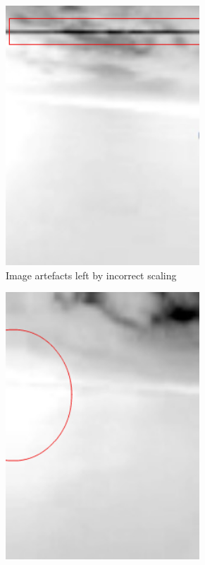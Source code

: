 \begin{figure}
\centering
\begin{subfigure}{0.3\textwidth}
 \centering
 \includegraphics[width=0.8\textwidth]{"./image/artefacts_circled"}
 \caption{Image artefacts left by incorrect scaling}
 \label{fig:defects:sub1}
\end{subfigure}
\begin{subfigure}{0.3\textwidth}
 \centering
 \includegraphics[width=0.8\textwidth]{"./image/flaring_circled"}

\end{subfigure}
\end{figure}
